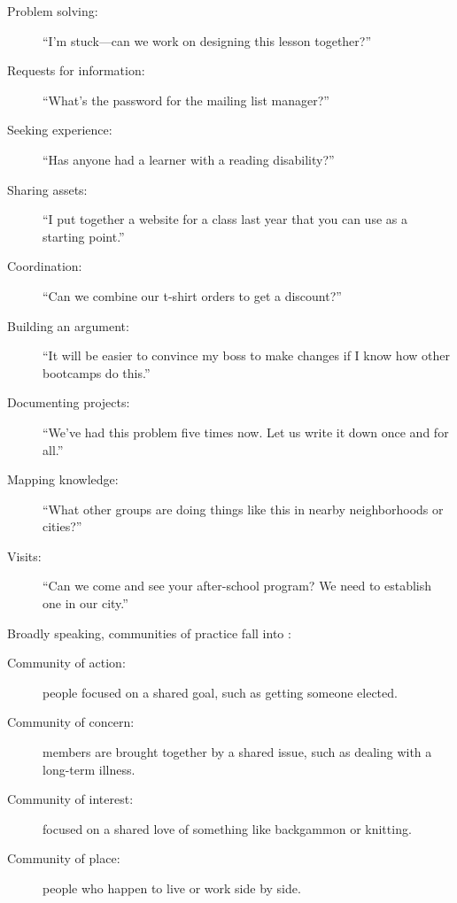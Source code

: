 \begin{description}

\item[Problem solving:]
  ``I'm stuck---can we work on designing this lesson together?''

\item[Requests for information:]
  ``What's the password for the mailing list manager?''

\item[Seeking experience:]
  ``Has anyone had a learner with a reading disability?''

\item[Sharing assets:]
  ``I put together a website for a class last year that you can use as a starting point.''

\item[Coordination:]
  ``Can we combine our t-shirt orders to get a discount?''

\item[Building an argument:]
  ``It will be easier to convince my boss to make changes if I know how other bootcamps do this.''

\item[Documenting projects:]
  ``We've had this problem five times now. Let us write it down once and for all.''

\item[Mapping knowledge:]
  ``What other groups are doing things like this in nearby neighborhoods or cities?''

\item[Visits:]
  ``Can we come and see your after-school program? We need to establish one in our city.''

\end{description}

Broadly speaking,
communities of practice fall into
:

\begin{description}

\item[Community of action:]
  people focused on a shared goal,
  such as getting someone elected.

\item[Community of concern:]
  members are brought together by a shared issue,
  such as dealing with a long-term illness.

\item[Community of interest:]
  focused on a shared love of something like backgammon or knitting.

\item[Community of place:]
  people who happen to live or work side by side.

\end{description}

